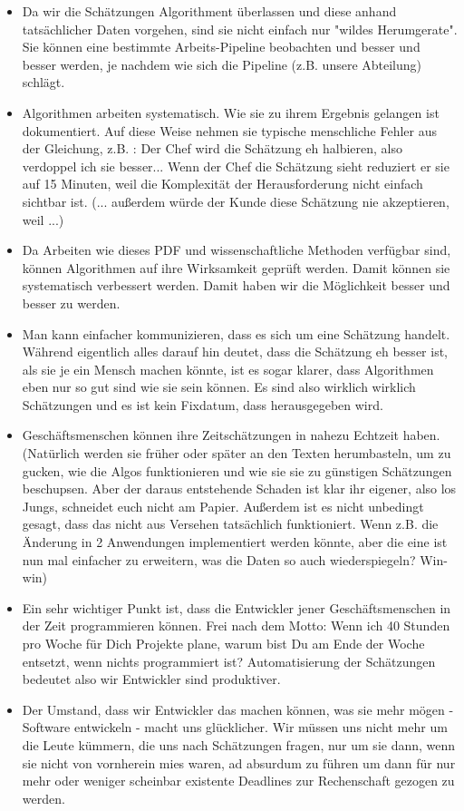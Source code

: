 \begin{itemize}
\tightlist
\item
    Da wir die Schätzungen Algorithment überlassen und diese anhand tatsächlicher Daten vorgehen, sind sie nicht einfach nur "wildes Herumgerate". Sie können eine bestimmte Arbeits-Pipeline beobachten und besser und besser werden, je nachdem wie sich die Pipeline (z.B. unsere Abteilung) schlägt.
\item
  Algorithmen arbeiten systematisch. Wie sie zu ihrem Ergebnis gelangen ist dokumentiert. Auf diese Weise nehmen sie typische menschliche Fehler aus der Gleichung, z.B. : Der Chef wird die Schätzung eh halbieren, also verdoppel ich sie besser... Wenn der Chef die Schätzung sieht reduziert er sie auf 15 Minuten, weil die Komplexität der Herausforderung nicht einfach sichtbar ist. (... außerdem würde der Kunde diese Schätzung nie akzeptieren, weil ...)
\item
  Da Arbeiten wie dieses PDF und wissenschaftliche Methoden verfügbar sind, können Algorithmen auf ihre Wirksamkeit geprüft werden. Damit können sie systematisch verbessert werden. Damit haben wir die Möglichkeit besser und besser zu werden.
\item
  Man kann einfacher kommunizieren, dass es sich um eine Schätzung handelt. Während eigentlich alles darauf hin deutet, dass die Schätzung eh besser ist, als sie je ein Mensch machen könnte, ist es sogar klarer, dass Algorithmen eben nur so gut sind wie sie sein können. Es sind also wirklich wirklich Schätzungen und es ist kein Fixdatum, dass herausgegeben wird.
\item
  Geschäftsmenschen können ihre Zeitschätzungen in nahezu Echtzeit haben. (Natürlich werden sie früher oder später an den Texten herumbasteln, um zu gucken, wie die Algos funktionieren und wie sie sie zu günstigen Schätzungen beschupsen. Aber der daraus entstehende Schaden ist klar ihr eigener, also los Jungs, schneidet euch nicht am Papier. Außerdem ist es nicht unbedingt gesagt, dass das nicht aus Versehen tatsächlich funktioniert. Wenn z.B. die Änderung in 2 Anwendungen implementiert werden könnte, aber die eine ist nun mal einfacher zu erweitern, was die Daten so auch wiederspiegeln? Win-win)
\item
  Ein sehr wichtiger Punkt ist, dass die Entwickler jener Geschäftsmenschen in der Zeit programmieren können. Frei nach dem Motto: Wenn ich 40 Stunden pro Woche für Dich Projekte plane, warum bist Du am Ende der Woche entsetzt, wenn nichts programmiert ist? Automatisierung der Schätzungen bedeutet also wir Entwickler sind produktiver.
\item
  Der Umstand, dass wir Entwickler das machen können, was sie mehr mögen - Software entwickeln - macht uns glücklicher. Wir müssen uns nicht mehr um die Leute kümmern, die uns nach  Schätzungen fragen, nur um sie dann, wenn sie nicht von vornherein mies waren, ad absurdum zu führen um dann für nur mehr oder weniger scheinbar existente Deadlines zur Rechenschaft gezogen zu werden.
\end{itemize}

